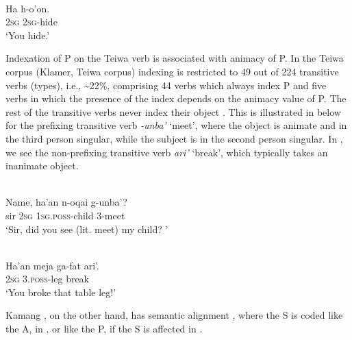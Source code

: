 \ea%
\label{bkm:Ref357868399}
 \\
\gll      Ha   h-o'on. \\  
   2\textsc{sg} 2\textsc{sg}{}-hide   \\
\glt  `You hide.'
\z







Indexation of P on the Teiwa  verb is associated with animacy  of P. In the Teiwa corpus (Klamer, Teiwa corpus) indexing is restricted to 49 out of 224 transitive verbs (types), i.e., \~{}22\%, comprising 44 verbs which always index P and five verbs in which the presence of the index depends on the animacy value of P. The rest of the transitive verbs never index their object . This is illustrated in  below for the prefixing transitive verb \textit{{}-}\textit{unba'} `meet', where the object is animate and in the third person singular, while the subject is in the second person singular. In , we see the non-prefixing transitive verb \textit{ari'} `break', which typically takes an inanimate object.


\ea%
\label{bkm:Ref306280773}
 \\
\gll      Name,  ha'an  n-oqai  g-unba'?\\  
  sir  2\textsc{sg} 1\textsc{sg}.\textsc{poss}{}-child  3-meet   \\
\glt `Sir, did you see (lit. meet) my child? '
\z

 

 

 


\ea%
\label{bkm:Ref306280777}
 \\
\gll    Ha'an  meja  ga-fat  ari'.\\  
    2\textsc{sg}  
    3.\textsc{poss}{}-leg  break  \\
\glt  `You broke that table leg!' 
\z







Kamang , on the other hand, has semantic alignment , where the S is coded like the A,  in , or like the P, if the S is affected in . 


